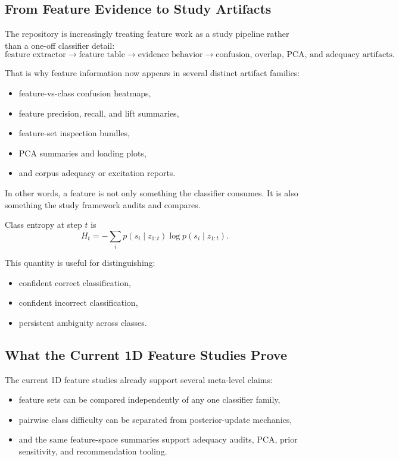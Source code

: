 \documentclass[11pt]{article}
\begin{document}
\subsection{From Feature Evidence to Study Artifacts}

The repository is increasingly treating feature work as a study pipeline rather
than a one-off classifier detail:
\begin{equation}
    \text{feature extractor}
    \rightarrow
    \text{feature table}
    \rightarrow
    \text{evidence behavior}
    \rightarrow
    \text{confusion, overlap, PCA, and adequacy artifacts}.
\end{equation}

That is why feature information now appears in several distinct artifact
families:
\begin{itemize}[leftmargin=1.5em]
    \item feature-vs-class confusion heatmaps,
    \item feature precision, recall, and lift summaries,
    \item feature-set inspection bundles,
    \item PCA summaries and loading plots,
    \item and corpus adequacy or excitation reports.
\end{itemize}

In other words, a feature is not only something the classifier consumes. It is
also something the study framework audits and compares.

Class entropy at step $t$ is
\begin{equation}
    H_t = - \sum_i p(s_i \mid z_{1:t}) \log p(s_i \mid z_{1:t}).
\end{equation}

This quantity is useful for distinguishing:
\begin{itemize}[leftmargin=1.5em]
    \item confident correct classification,
    \item confident incorrect classification,
    \item persistent ambiguity across classes.
\end{itemize}

\subsection{What the Current 1D Feature Studies Prove}

The current 1D feature studies already support several meta-level claims:
\begin{itemize}[leftmargin=1.5em]
    \item feature sets can be compared independently of any one classifier
    family,
    \item pairwise class difficulty can be separated from posterior-update
    mechanics,
    \item and the same feature-space summaries support adequacy audits, PCA,
    prior sensitivity, and recommendation tooling.
\end{itemize}
\end{document}
